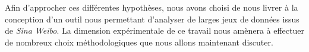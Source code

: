 \bigskip

Afin d{\textquoteright}approcher ces différentes hypothèses, nous avons choisi de nous livrer à la conception d'un outil nous permettant d'analyser de larges jeux de données issus de \textit{Sina Weibo}. La dimension expérimentale de ce travail nous amènera à effectuer de nombreux choix méthodologiques que nous allons maintenant discuter.